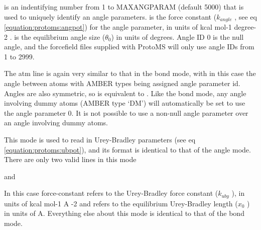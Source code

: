 \documentclass[letterpaper,10pt,english]{sphinxmanual}
\begin{document}
 is an indentifying number from 1 to MAXANGPARAM (default 5000) that is used to uniquely identify an angle parameters.  is the force constant (\(k_{angle}\) , see eq \eqref{equation:protoms:angpot}) for the angle parameter, in units of kcal mol-1 degree-2 .  is the equilibrium angle size (\(\theta_0\)) in units of degrees. Angle ID 0 is the null angle, and the forcefield files supplied with ProtoMS will only use angle IDs from 1 to 2999.

The atm line is again very similar to that in the bond mode, with in this case the angle between atoms with AMBER types  being assigned angle parameter id. Angles are also symmetric, so  is equivalent to . Like the bond mode, any angle involving dummy atoms (AMBER type ‘DM’) will automatically be set to use the angle parameter 0. It is not possible to use a non-null angle parameter over an angle involving dummy atoms.

\ignorespaces 
{}

This mode is used to read in Urey-Bradley parameters (see eq \eqref{equation:protoms:ubpot}), and its format is identical to that of the angle mode. There are only two valid lines in this mode

%
\begin{sphinxVerbatim}[commandchars=\\\{\}]
   
\end{sphinxVerbatim}

and

%
\begin{sphinxVerbatim}[commandchars=\\\{\}]
    
\end{sphinxVerbatim}

In this case force-constant refers to the Urey-Bradley force constant (\(k_{uby}\) ), in units of kcal mol-1 A -2 and  refers to the equilibrium Urey-Bradley length (\(x_0\) ) in units of A. Everything else about this mode is identical to that of the bond mode.
\end{document}
